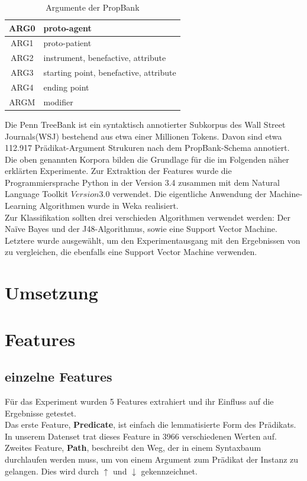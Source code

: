 \documentclass[]{article}
\begin{document}
\begin{table}
	\centering
	\begin{tabular}{|c|l|}
	\hline 
	ARG0 & proto-agent \\ 
	\hline 
	ARG1 & proto-patient \\ 
	\hline 
	ARG2 & instrument, benefactive, attribute \\ 
	\hline 
	ARG3 & starting point, benefactive, attribute \\ 
	\hline 
	ARG4 & ending point \\ 
	\hline 
	ARGM & modifier \\ 
	\hline 
	\end{tabular}
	\caption{Argumente der PropBank}
	\end{table}
	Die Penn TreeBank \cite{Marcus93buildinga} ist ein syntaktisch annotierter Subkorpus des Wall Street Journals(WSJ) bestehend aus etwa einer Millionen Tokens. Davon sind etwa 112.917 Prädikat-Argument Strukuren nach dem PropBank-Schema annotiert. 
	\\
	Die oben genannten Korpora bilden die Grundlage für die im Folgenden näher erklärten Experimente.
	Zur Extraktion der Features wurde die Programmiersprache Python in der Version 3.4 zusammen mit dem Natural Language Toolkit \(Version 3.0\) verwendet. Die eigentliche Anwendung der Machine-Learning Algorithmen wurde in Weka \cite{Hall+FHPRW:2009} realisiert.
	\\
	Zur Klassifikation sollten drei verschieden Algorithmen verwendet werden:
	Der Naïve Bayes und der J48-Algorithmus, sowie eine Support
	Vector Machine. Letztere wurde ausgewählt, um den Experimentausgang mit den Ergebnissen von \cite{Pradhan05supportvector} zu vergleichen, die ebenfalls eine Support Vector Machine verwenden.
	
	
	



\section{Umsetzung} 

\section{Features}
\subsection{einzelne Features}
Für das Experiment wurden 5 Features extrahiert und ihr Einfluss auf die Ergebnisse getestet.\\
Das erste Feature, \textbf{Predicate}, ist einfach die lemmatisierte Form des Prädikats. In unserem Datenset trat dieses Feature in 3966 verschiedenen Werten auf.\\
Zweites Feature, \textbf{Path}, beschreibt den Weg, der in einem Syntaxbaum durchlaufen werden muss, um von einem Argument zum Prädikat der Instanz zu gelangen. Dies wird durch $\uparrow$ und $\downarrow$ gekennzeichnet.
\end{document}
